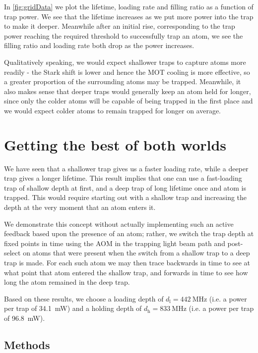 \documentclass[../Thesis-IJspeert.tex]{subfiles}
\begin{document}
In \cref{fig:gridData} we plot the lifetime, loading rate and filling ratio as a function of trap power. We see that the lifetime increases as we put more power into the trap to make it deeper. Meanwhile after an initial rise, corresponding to the trap power reaching the required threshold to successfully trap an atom, we see the filling ratio and loading rate both drop as the power increases.

Qualitatively speaking, we would expect shallower traps to capture atoms more readily - the Stark shift is lower and hence the MOT cooling is more effective, so a greater proportion of the surrounding atoms may be trapped. Meanwhile, it also makes sense that deeper traps would generally keep an atom held for longer, since only the colder atoms will be capable of being trapped in the first place and we would expect colder atoms to remain trapped for longer on average.


\section{Getting the best of both worlds}

We have seen that a shallower trap gives us a faster loading rate, while a deeper trap gives a longer lifetime. This result implies that one can use a fast-loading trap of shallow depth at first, and a deep trap of long lifetime once and atom is trapped. This would require starting out with a shallow trap and increasing the depth at the very moment that an atom enters it.

We demonstrate this concept without actually implementing such an active feedback based upon the presence of an atom; rather, we switch the trap depth at fixed points in time using the AOM in the trapping light beam path and post-select on atoms that were present when the switch from a shallow trap to a deep trap is made. For each such atom we may then trace backwards in time to see at what point that atom entered the shallow trap, and forwards in time to see how long the atom remained in the deep trap.
\fi




Based on these results, we choose a loading depth of $d_\mathrm{l} = \SI{442}{\mega\hertz}$ (i.e. a power per trap of \SI{34.1}{\milli\watt}) and a holding depth of $d_\mathrm{h} = \SI{833}{\mega\hertz}$ (i.e. a power per trap of \SI{96.8}{\milli\watt}).






\subsection{Methods}
\label{subsec:switchMethod}
\end{document}
